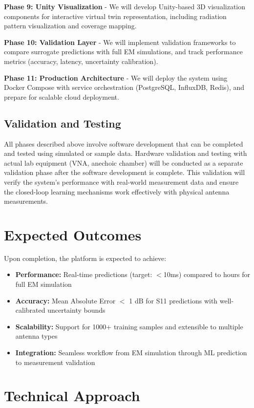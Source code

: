 \documentclass[11pt]{article}
\begin{document}
\textbf{Phase 9: Unity Visualization} - We will develop Unity-based 3D visualization components for interactive virtual twin representation, including radiation pattern visualization and coverage mapping.

\textbf{Phase 10: Validation Layer} - We will implement validation frameworks to compare surrogate predictions with full EM simulations, and track performance metrics (accuracy, latency, uncertainty calibration).

\textbf{Phase 11: Production Architecture} - We will deploy the system using Docker Compose with service orchestration (PostgreSQL, InfluxDB, Redis), and prepare for scalable cloud deployment.

\subsection{Validation and Testing}
All phases described above involve software development that can be completed and tested using simulated or sample data. Hardware validation and testing with actual lab equipment (VNA, anechoic chamber) will be conducted as a separate validation phase after the software development is complete. This validation will verify the system's performance with real-world measurement data and ensure the closed-loop learning mechanisms work effectively with physical antenna measurements.

\section{Expected Outcomes}

Upon completion, the platform is expected to achieve:
\begin{itemize}
    \item \textbf{Performance:} Real-time predictions (target: $<$10ms) compared to hours for full EM simulation
    \item \textbf{Accuracy:} Mean Absolute Error $<$ 1 dB for S11 predictions with well-calibrated uncertainty bounds
    \item \textbf{Scalability:} Support for 1000+ training samples and extensible to multiple antenna types
    \item \textbf{Integration:} Seamless workflow from EM simulation through ML prediction to measurement validation
\end{itemize}

\section{Technical Approach}
\end{document}
